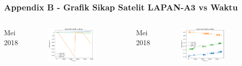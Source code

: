 \documentclass[8pt]{beamer}
\begin{document}
\begin{frame}
  \frametitle{Appendix B - Grafik Sikap Satelit LAPAN-A3 vs Waktu}
  \begin{columns}[T]
     Mei 2018
      \begin{figure}
          \includegraphics[width=0.8\textwidth]{figure/attitude_2018-05-19.png}
      \end{figure}
     Mei 2018
      \begin{figure}
          \includegraphics[width=0.8\textwidth]{figure/attitude_2018-05-20.png}
      \end{figure}
  \end{columns}
\end{frame}
\end{document}
